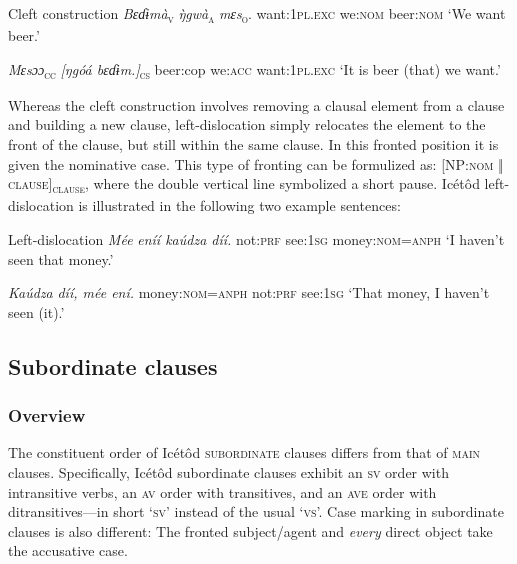 Cleft construction
\textit{Bɛɗɨmà}\textsc{\textsubscript{v}}    \textit{\`{ŋ}gwà}\textsc{\textsubscript{a}}\textit{    mɛs}\textsc{\textsubscript{o}}.
want:\textsc{1pl.exc}   we:\textsc{nom}  beer:\textsc{nom}
‘We want beer.’




\textit{Mɛsɔɔ}\textsc{\textsubscript{cc}}     \textit{[ŋgóá    bɛɗɨm.]}\textsc{\textsubscript{cs}}
beer:cop    we:\textsc{acc}   want:\textsc{1pl.exc}   
‘It is beer (that) we want.’


Whereas the cleft construction involves removing a clausal element from a clause and building a new clause, left-dislocation simply relocates the element to the front of the clause, but still within the same clause. In this fronted position it is given the nominative case. This type of fronting can be formulized as: [NP:\textsc{nom} \textsc{‖}\textsc{ clause]}\textsc{\textsubscript{clause}}, where the double vertical line symbolized a short pause. Icétôd left-dislocation is illustrated in the following two example sentences:




Left-dislocation
\textit{Mée}   \textit{eníí     kaúdza díí.}
not:\textsc{prf}   see:\textsc{1sg}   money:\textsc{nom}=\textsc{anph}
‘I haven’t seen that money.’




\textit{Kaúdza} \textit{díí,     mée     ení.}
money:\textsc{nom}=\textsc{anph}   not:\textsc{prf}   see:\textsc{1sg}
‘That money, I haven’t seen (it).’






\subsection{Subordinate clauses}
\subsubsection{Overview}

The constituent order of Icétôd \textsc{subordinate} clauses differs from that of \textsc{main} clauses. Specifically, Icétôd subordinate clauses exhibit an \textsc{sv} order with intransitive verbs, an \textsc{av} order with transitives, and an \textsc{ave} order with ditransitives—in short ‘\textsc{sv}’ instead of the usual ‘\textsc{vs}’. Case marking in subordinate clauses is also different: The fronted subject/agent and \textit{every} direct object take the accusative case. 


